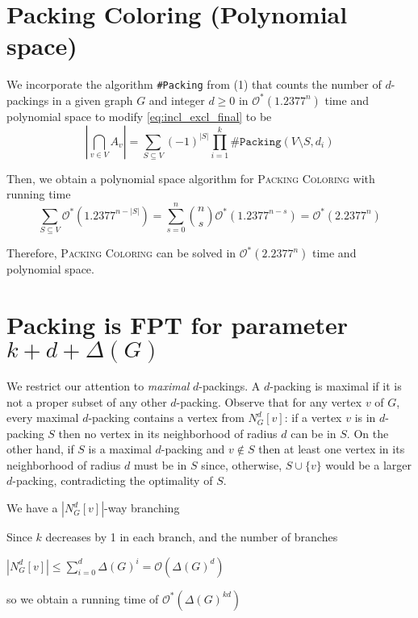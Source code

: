 \documentclass[12pt, a4paper]{article}
\theoremstyle{definition}
\newcommand{\mcO}{\mathcal{O}}
\begin{document}
\section{\sc Packing Coloring (\textnormal{Polynomial space})}

We incorporate the algorithm \texttt{\#Packing} from (1) that counts the number of $d$-packings in a given graph $G$ and integer $d \ge 0$ in $\mcO^*(1.2377^n)$ time and polynomial space to modify \cref{eq:incl_excl_final} to be
\begin{equation*}
	\left | \bigcap_{v \in V} A_v \right | 
	= \sum_{S \subseteq V} (-1)^{|S|} \prod_{i=1}^{k} \texttt{\#Packing}(V \setminus S, d_i)
\end{equation*}

Then, we obtain a polynomial space algorithm for \textsc{Packing Coloring} with running time
\begin{equation*}
	\sum_{S\subseteq V} \mcO^*(1.2377^{n-|S|}) = \sum_{s=0}^n \binom{n}{s} \mcO^*(1.2377^{n-s}) = \mcO^*(2.2377^n)
\end{equation*}

Therefore, \textsc{Packing Coloring} can be solved in $\mcO^*(2.2377^n)$ time and polynomial space.

\section{\sc Packing \textnormal{is FPT for parameter $k + d + \Delta (G)$} }

We restrict our attention to \emph{maximal} $d$-packings. A $d$-packing is maximal if it is not a proper subset of any other $d$-packing. Observe that for any vertex $v$ of $G$, every maximal $d$-packing contains a vertex from $N_G^d[v]$: if a vertex $v$ is in $d$-packing $S$ then no vertex in its neighborhood of radius $d$ can be in $S$. On the other hand, if $S$ is a maximal $d$-packing and $v \notin S$ then at least one vertex in its neighborhood of radius $d$ must be in $S$ since, otherwise, $S\cup \{ v \}$ would be a larger $d$-packing, contradicting the optimality of $S$.

We have a $|N_G^d[v]|$-way branching

Since $k$ decreases by 1 in each branch, and the number of branches

$|N_G^d[v]| \leq \sum_{i=0}^{d} \Delta(G)^i = \mcO(\Delta(G)^d)$ 

so we obtain a running time of $\mcO^{*}(\Delta(G)^{kd})$
\end{document}
